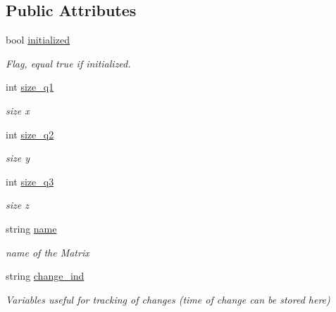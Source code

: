 \subsection*{Public Attributes}
\begin{DoxyCompactItemize}
\item 
\hypertarget{class_matrix3_d_ad66e3269a3753261600bb70a13b53d79}{}bool \hyperlink{class_matrix3_d_ad66e3269a3753261600bb70a13b53d79}{initialized}\label{class_matrix3_d_ad66e3269a3753261600bb70a13b53d79}

\begin{DoxyCompactList}\small\item\em Flag, equal true if initialized. \end{DoxyCompactList}\item 
\hypertarget{class_matrix3_d_a17b970c10970ba4afb4eeeceac982923}{}int \hyperlink{class_matrix3_d_a17b970c10970ba4afb4eeeceac982923}{size\+\_\+q1}\label{class_matrix3_d_a17b970c10970ba4afb4eeeceac982923}

\begin{DoxyCompactList}\small\item\em size x \end{DoxyCompactList}\item 
\hypertarget{class_matrix3_d_a67850dcae2638afe85050b8cf304a98c}{}int \hyperlink{class_matrix3_d_a67850dcae2638afe85050b8cf304a98c}{size\+\_\+q2}\label{class_matrix3_d_a67850dcae2638afe85050b8cf304a98c}

\begin{DoxyCompactList}\small\item\em size y \end{DoxyCompactList}\item 
\hypertarget{class_matrix3_d_a7da71b86af303a7d565763ff808df477}{}int \hyperlink{class_matrix3_d_a7da71b86af303a7d565763ff808df477}{size\+\_\+q3}\label{class_matrix3_d_a7da71b86af303a7d565763ff808df477}

\begin{DoxyCompactList}\small\item\em size z \end{DoxyCompactList}\item 
\hypertarget{class_matrix3_d_ae120ce40c0f37956f419de3405e30cf2}{}string \hyperlink{class_matrix3_d_ae120ce40c0f37956f419de3405e30cf2}{name}\label{class_matrix3_d_ae120ce40c0f37956f419de3405e30cf2}

\begin{DoxyCompactList}\small\item\em name of the Matrix \end{DoxyCompactList}\item 
\hypertarget{class_matrix3_d_a32921764532ebc755b4b2e569b9a680f}{}string \hyperlink{class_matrix3_d_a32921764532ebc755b4b2e569b9a680f}{change\+\_\+ind}\label{class_matrix3_d_a32921764532ebc755b4b2e569b9a680f}

\begin{DoxyCompactList}\small\item\em Variables useful for tracking of changes (time of change can be stored here) \end{DoxyCompactList}\end{DoxyCompactItemize}
